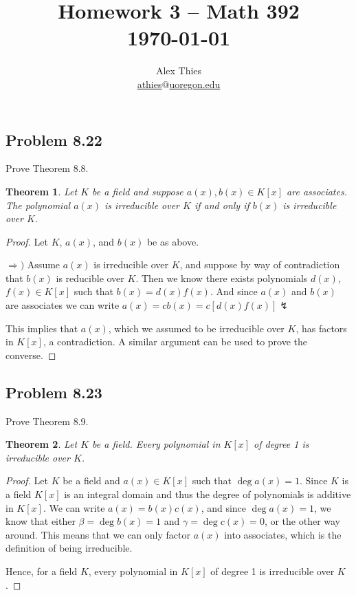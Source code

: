\documentclass[letterpaper, 12pt]{amsart}
\newtheorem{thm}{Theorem}
\begin{document}
	\title{Homework 3  -- Math 392 \\ \today}
	\author{Alex Thies \\ \href{mailto:athies@uoregon.edu}{\lowercase{athies$@$uoregon.edu}}}

	\maketitle

	\subsection*{Problem 8.22}
	\label{sub:problem_8_22}
	Prove Theorem 8.8.
	\setcounter{thm}{7}
		\begin{thm}
		Let $K$ be a field and suppose $a(x), b(x) \in K[x]$ are associates. 
		The polynomial $a(x)$ is irreducible over $K$ if and only if $b(x)$ is irreducible over $K$.
		\end{thm}

		\begin{proof}
		Let $K$, $a(x)$, and $b(x)$ be as above.

		$\Rightarrow)$ Assume $a(x)$ is irreducible over $K$, and suppose by way of contradiction that $b(x)$ is reducible over $K$.
		Then we know there exists polynomials $d(x)$,$f(x) \in K[x]$ such that $b(x) = d(x)f(x)$.
		And since $a(x)$ and $b(x)$ are associates we can write $a(x) = cb(x) = c[d(x)f(x)] \lightning$
		
		This implies that $a(x)$, which we assumed to be irreducible over $K$, has factors in $K[x]$, a contradiction.
		A similar argument can be used to prove the converse.
		\end{proof}

	\subsection*{Problem 8.23}
	\label{sub:problem_8_23}
	Prove Theorem 8.9.
		\begin{thm}
		Let $K$ be a field. 
		Every polynomial in $K[x]$ of degree 1 is irreducible over $K$.
		\end{thm}

		\begin{proof}
		Let $K$ be a field and $a(x) \in K[x]$ such that $\deg{a(x)} = 1$.
		Since $K$ is a field $K[x]$ is an integral domain and thus the degree of polynomials is additive in $K[x]$.
		We can write $a(x) = b(x)c(x)$, and since $\deg{a(x)} = 1$, we know that either $\beta = \deg{b(x)} = 1$ and $\gamma = \deg{c(x)} = 0$, or the other way around.
		This means that we can only factor $a(x)$ into associates, which is the definition of being irreducible.

		Hence, for a field $K$, every polynomial in $K[x]$ of degree 1 is irreducible over $K$.
		\end{proof}
\end{document}
